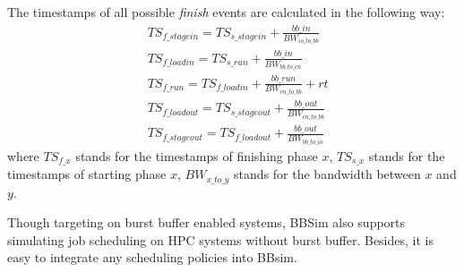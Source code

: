 % 



The timestamps of all possible \textit{finish} events are calculated in the following way:
\begin{align}
        & TS_{f\_stagein} = TS_{s\_stagein} + \frac{bb\_in}{BW_{io\_to\_bb}}\label{Equ:FinIn} \\
        & TS_{f\_loadin} = TS_{s\_run} + \frac{bb\_in}{BW_{bb\_to\_cn}}\label{Equ:FinMemIn} \\
        & TS_{f\_run} = TS_{f\_loadin} + \frac{bb\_run}{BW_{cn\_to\_bb}} + rt\label{Equ:FinRun} \\
        & TS_{f\_loadout} = TS_{s\_stageout} + \frac{bb\_out}{BW_{cn\_to\_bb}}\label{Equ:FinMemOut} \\
        & TS_{f\_stageout} = TS_{f\_loadout} + \frac{bb\_out}{BW_{bb\_to\_io}} \label{Equ:FinOut}
\end{align}
where $TS_{f\_x}$ stands for the timestamps of finishing phase $x$,
$TS_{s\_x}$ stands for the timestamps of starting phase $x$,
$BW_{x\_to\_y}$ stands for the bandwidth between $x$ and $y$.

Though targeting on burst buffer enabled systems, 
BBSim also supports simulating job scheduling on HPC systems without burst buffer.
Besides, it is easy to integrate any scheduling policies into BBsim. 

